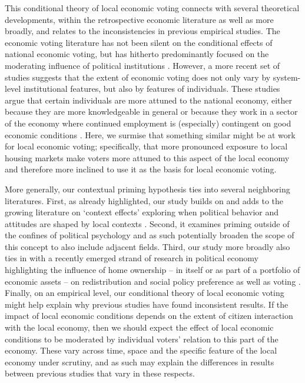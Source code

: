 \documentclass[12pt,a4paper]{article}
\begin{document}
	This conditional theory of local economic voting connects with several theoretical developments, within the retrospective economic literature as well as more broadly, and relates to the inconsistencies in previous empirical studies. 
	The economic voting literature has not been silent on the conditional effects of national economic voting, but has hitherto predominantly focused on the moderating influence of political institutions \cite[cf.][]{powell1993cross, duch2008economic}. However, a more recent set of studies suggests that the extent of economic voting does not only vary by system-level institutional features, but also by features of individuals. These studies argue that certain individuals are more attuned to the national economy, either because they are more knowledgeable in general \citep{vries2014holding} or because they work in a sector of the economy where continued employment is (especially) contingent on good economic conditions \citep{singer2011says, singer2011voters,singer2013goes, fossati2014economic}. Here, we surmise that something similar might be at work for local economic voting; specifically, that more pronounced exposure to local housing markets make voters more attuned to this aspect of the local economy and therefore more inclined to use it as the basis for local economic voting.
	
	More generally, our contextual priming hypothesis ties into several neighboring literatures. First, as already highlighted, our study builds on and adds to the growing literature on `context effects' exploring when political behavior and attitudes are shaped by local contexts \citep[e.g.,][]{hopkins2010politicized,danckert2017reacting}. Second, it examines priming outside of the confines of political psychology and as such potentially broaden the scope of this concept to also include adjacent fields. Third, our study more broadly also ties in with a recently emerged strand of research in political economy highlighting the influence of home ownership -- in itself or as part of a portfolio of economic assets -- on redistribution and social policy preference as well as voting \citep{ansell2014political,nadeau2010patrimonial,stubager2013reaching}. 
	Finally, on an empirical level, our conditional theory of local economic voting might help explain why previous studies have found inconsistent results. If the impact of local economic conditions depends on the extent of citizen interaction with the local economy, then we should expect the effect of local economic conditions to be moderated by individual voters’ relation to this part of the economy. These vary across time, space and the specific feature of the local economy under scrutiny, and as such may explain the differences in results between previous studies that vary in these respects.
	
\end{document}
